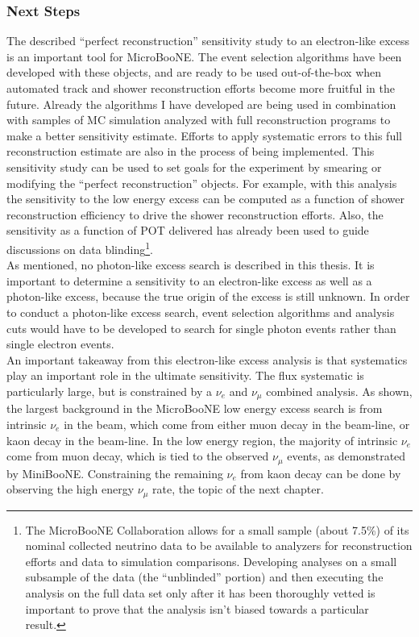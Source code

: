 \subsubsection{Next Steps}
The described ``perfect reconstruction'' sensitivity study to an electron-like excess is an important tool for MicroBooNE. The event selection algorithms have been developed with these objects, and are ready to be used out-of-the-box when automated track and shower reconstruction efforts become more fruitful in the future. Already the algorithms I have developed are being used in combination with samples of MC simulation analyzed with full reconstruction programs to make a better sensitivity estimate. Efforts to apply systematic errors to this full reconstruction estimate are also in the process of being implemented. This sensitivity study can be used to set goals for the experiment by smearing or modifying the ``perfect reconstruction'' objects. For example, with this analysis the sensitivity to the low energy excess can be computed as a function of shower reconstruction efficiency to drive the shower reconstruction efforts. Also, the sensitivity as a function of POT delivered has already been used to guide discussions on data blinding\footnote{The MicroBooNE Collaboration allows for a small sample (about 7.5\%) of its nominal collected neutrino data to be available to analyzers for reconstruction efforts and data to simulation comparisons. Developing analyses on a small subsample of the data (the ``unblinded'' portion) and then executing the analysis on the full data set only after it has been thoroughly vetted is important to prove that the analysis isn't biased towards a particular result.}.\\

As mentioned, no photon-like excess search is described in this thesis. It is important to determine a sensitivity to an electron-like excess as well as a photon-like excess, because the true origin of the excess is still unknown. In order to conduct a photon-like excess search, event selection algorithms and analysis cuts would have to be developed to search for single photon events rather than single electron events.\\

An important takeaway from this electron-like excess analysis is that systematics play an important role in the ultimate sensitivity. The flux systematic is particularly large, but is constrained by a $\nu_e$ and $\nu_\mu$ combined analysis. As shown, the largest background in the MicroBooNE low energy excess search is from intrinsic $\nu_e$ in the beam, which come from either muon decay in the beam-line, or kaon decay in the beam-line. In the low energy region, the majority of intrinsic $\nu_e$ come from muon decay, which is tied to the observed $\nu_\mu$ events, as demonstrated by MiniBooNE. Constraining the remaining $\nu_e$ from kaon decay can be done by observing the high energy $\nu_\mu$ rate, the topic of the next chapter.

